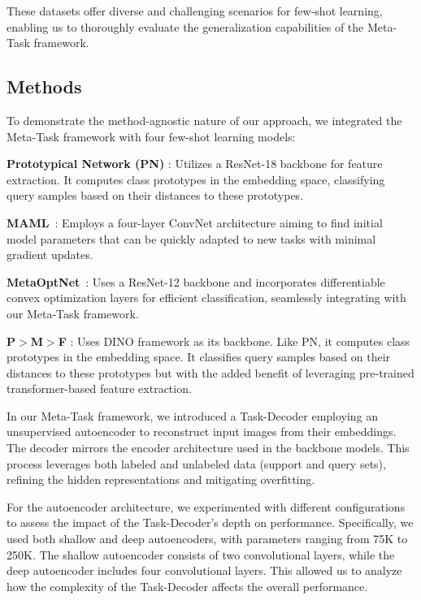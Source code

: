 These datasets offer diverse and challenging scenarios for few-shot learning, enabling us to thoroughly evaluate the generalization capabilities of the {Meta-Task} framework.

\subsection{Methods}

To demonstrate the method-agnostic nature of our approach, we integrated the {Meta-Task} framework with four few-shot learning models:

\noindent
\textbf{Prototypical Network (PN)} \cite{proto}: Utilizes a ResNet-18 \cite{resnet} backbone for feature extraction. It computes class prototypes in the embedding space, classifying query samples based on their distances to these prototypes.

\noindent
\textbf{MAML}~\cite{maml}: Employs a four-layer ConvNet architecture aiming to find initial model parameters that can be quickly adapted to new tasks with minimal gradient updates.

\noindent
\textbf{MetaOptNet}~\cite{lee2019meta}: Uses a ResNet-12 backbone and incorporates differentiable convex optimization layers for efficient classification, seamlessly integrating with our {Meta-Task} framework.

{\color{black} \noindent
\textbf{P$>$M$>$F} \cite{pmf}: Uses DINO\cite{dino} framework as its backbone. Like PN, it computes class prototypes in the embedding space. It classifies query samples based on their distances to these prototypes but with the added benefit of leveraging pre-trained transformer-based feature extraction.}

In our {Meta-Task} framework, we introduced a Task-Decoder employing an unsupervised autoencoder to reconstruct input images from their embeddings. The decoder mirrors the encoder architecture used in the backbone models. This process leverages both labeled and unlabeled data (support and query sets), refining the hidden representations and mitigating overfitting.

For the autoencoder architecture, we experimented with different configurations to assess the impact of the Task-Decoder's depth on performance. Specifically, we used both shallow and deep autoencoders, with parameters ranging from 75K to 250K. The shallow autoencoder consists of two convolutional layers, while the deep autoencoder includes four convolutional layers. This allowed us to analyze how the complexity of the Task-Decoder affects the overall performance.

